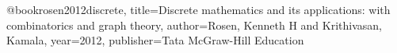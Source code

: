 @book{rosen2012discrete,
  title={Discrete mathematics and its applications: with combinatorics and graph theory},
  author={Rosen, Kenneth H and Krithivasan, Kamala},
  year={2012},
  publisher={Tata McGraw-Hill Education}
}